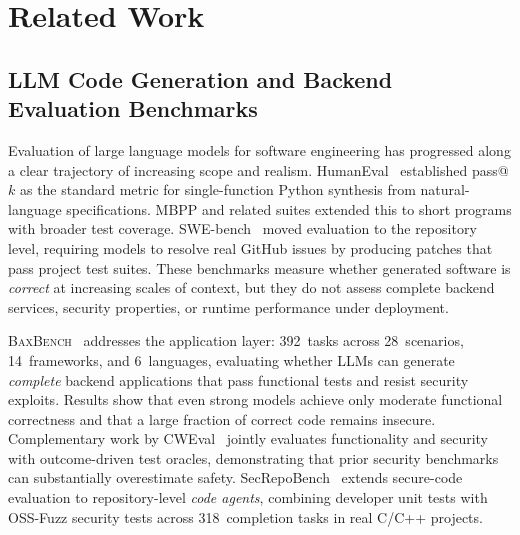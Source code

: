 
\chapter{Related Work}
\label{ch:related-work}


\section{LLM Code Generation and Backend Evaluation Benchmarks}
\label{sec:rw-benchmarks}

Evaluation of large language models for software engineering has progressed
along a clear trajectory of increasing scope and realism.
HumanEval~\cite{chen2021humaneval} established pass@$k$ as the standard metric
for single-function Python synthesis from natural-language specifications.
MBPP and related suites extended this to short programs with broader test
coverage.  SWE-bench~\cite{jimenez2024swebench} moved evaluation to the
repository level, requiring models to resolve real GitHub issues by producing
patches that pass project test suites.  These benchmarks measure whether
generated software is \emph{correct} at increasing scales of context, but they
do not assess complete backend services, security properties, or runtime
performance under deployment.

\textsc{BaxBench}~\cite{vero2025baxbench} addresses the application layer:
392~tasks across 28~scenarios, 14~frameworks, and 6~languages, evaluating
whether LLMs can generate \emph{complete} backend applications that pass
functional tests and resist security exploits.  Results show that even strong
models achieve only moderate functional correctness and that a large fraction of
correct code remains insecure.  Complementary work by CWEval~\cite{peng2025cweval}
jointly evaluates functionality and security with outcome-driven test oracles,
demonstrating that prior security benchmarks can substantially overestimate
safety.  SecRepoBench~\cite{shen2026secrepobench} extends secure-code evaluation
to repository-level \emph{code agents}, combining developer unit tests with
OSS-Fuzz security tests across 318~completion tasks in real C/C++ projects.

